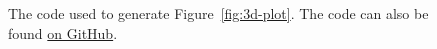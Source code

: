 \documentclass[a4paper]{article}
\begin{document}
\begin{figure}[h]
    \centering
    \inputminted{python}{./code/plot_surface.py}
    \caption{The code used to generate Figure~\ref{fig:3d-plot}. The code can also be found \href{https://github.com/DoctorDalek1963/uni/blob/1ee2e9f33bdd8e5d2054b4487684af46f686b5bd/first-year/MA144-Methods-of-Mathematical-Modelling-2/Ass 2/code/plot_surface.py}{on GitHub}.}
\end{figure}

\end{document}
